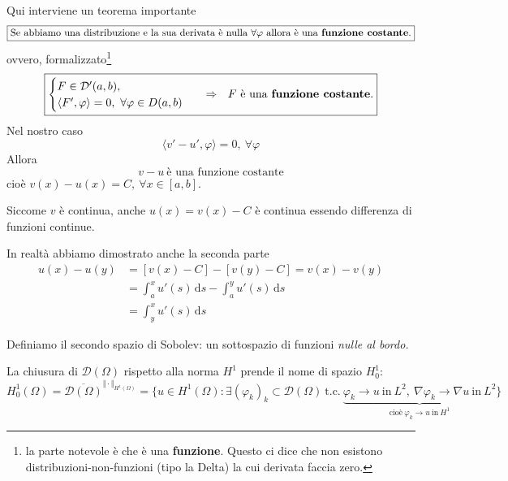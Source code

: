 \documentclass[10pt,a4paper,twoside,openright]{book}
\newcommand{\de}{\,\mathrm d}
\newcommand{\ds}{\de s}
\begin{document}
\begin{dimostrazione}
Qui interviene un teorema importante
\begin{equation*}
	\boxed{\text{Se abbiamo una distribuzione e la sua derivata è nulla} \ \forall \varphi \ \text{allora è una \textbf{funzione costante}.}}
\end{equation*}
ovvero, formalizzato\footnote{la parte notevole è che è una \textbf{funzione}. Questo ci dice che non esistono distribuzioni-non-funzioni (tipo la Delta) la cui derivata faccia zero.}
\begin{equation*}
	\boxed{
	\begin{cases}
		F\in \mathcal{D} '(a,b) ,\\
		\langle F',\varphi \rangle =0,\ \forall \varphi \in D(a,b)
		\end{cases} \ \ \Rightarrow \ \ F\ \text{è una \textbf{funzione costante}.}}
\end{equation*}
Nel nostro caso
\begin{equation*}
	\langle v'-u',\varphi \rangle =0,\ \forall \varphi 
\end{equation*}
Allora
\begin{equation*}
	v-u\ \text{è una funzione costante}
\end{equation*}
cioè $v(x) -u(x) =C,\ \forall x\in [ a,b]$.

Siccome $v$ è continua, anche $u(x) =v(x) -C$ è continua essendo differenza di funzioni continue.

In realtà abbiamo dimostrato anche la seconda parte
\begin{align*}
	u(x) -u(y) & =[ v(x) -C] -[ v(y) -C] =v(x) -v(y)          \\
	             & =\int ^{x}_{a} u'(s) \ds-\int ^{y}_{a} u'(s) \ds \\
	             & =\int ^{x}_{y} u'(s) \ds                         
\end{align*}
\end{dimostrazione}
Definiamo il secondo spazio di Sobolev: un sottospazio di funzioni \textit{nulle al bordo.}
\begin{definition}
	La chiusura di $\mathcal{D}(\Omega)$ rispetto alla norma $H^{1}$ prende il nome di spazio $H^{1}_{0}$:
	\begin{equation*}
		H^{1}_{0}(\Omega) =\overline{\mathcal{D}(\Omega)}^{\Vert \cdotp \Vert _{H^{1}(\Omega)}}                                                                                                                                                                                                                             
		                    =\bigg\{u\in H^{1}(\Omega) :\exists (\varphi _{k})_{k} \subset \mathcal{D}(\Omega) \ \text{t.c.} \ \underbrace{\varphi _{k}\rightarrow u\ \text{in} \ L^{2} ,\ \nabla \varphi _{k}\rightarrow \nabla u\ \text{in} \ L^{2}}_{\text{cioè} \ \varphi _{k}\rightarrow u\ \text{in} \ H^{1}}\bigg\} 
	\end{equation*}
\end{definition}
\end{document}
